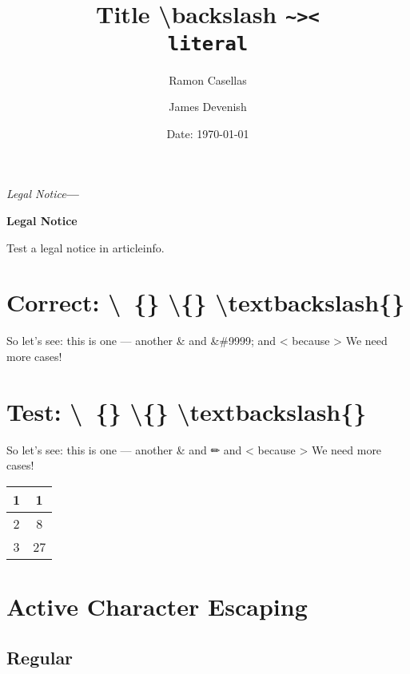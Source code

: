 \documentclass[pdftex,english,a4paper,10pt]{article}
\title{\textbf{Title \textbackslash backslash {\texttt{{\textasciitilde{}><\docbooktolatexgobble\string\\literal}}} }}
\date{Date: \today}
\author{Ramon Casellas \and James Devenish}
\begin{document}
{\maketitle\pagestyle{empty}\thispagestyle{empty}}
\vspace{-.3em}
\if@twocolumn
\noindent\small{\itshape 
Legal Notice}\/\bfseries---$\!$%
\else
\noindent\begin{center}\small\bfseries 
Legal Notice\end{center}\quotation\small
\fi

Test a legal notice in articleinfo.
\vspace{0.6em}\par\if@twocolumn\else\endquotation\fi
\normalsize\rmfamily

\section{Correct: \textbackslash\ \{\} \textbackslash\{\} \textbackslash textbackslash\{\}}

	So let's see: this is one --- another \& and \&\#9999; and \textless{} because \textgreater{}
	We need more cases!
	

\section{Test: \textbackslash \ \{\} \textbackslash \{\} \textbackslash textbackslash\{\}}
\label{id176187}\hypertarget{id176187}{}%


	So let's see: this is one — another \& and ✏ and \textless{} because \textgreater{}
	We need more cases!
	

\begin{center}
\label{itable}\hypertarget{itable}{}%
\begin{tabular}{|c|c|}
\hline 
1 & 1 \tabularnewline
 \hline 
2 & 8 \tabularnewline
 \hline 
3 & 27 \tabularnewline
\hline 
\end{tabular}
\end{center}


\section{Active Character Escaping}
\label{id176412}\hypertarget{id176412}{}%
\subsection{Regular}
\label{id176418}\hypertarget{id176418}{}%
\end{document}
